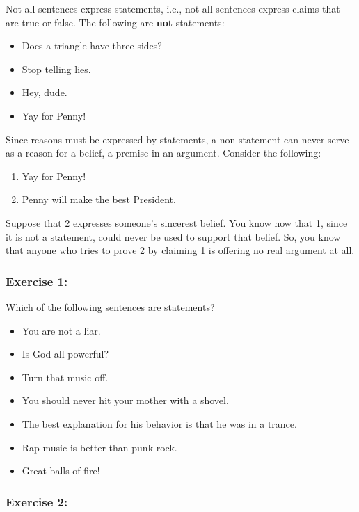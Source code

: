 \documentclass[]{article}
\providecommand{\tightlist}{%
  \setlength{\itemsep}{0pt}\setlength{\parskip}{0pt}}
\begin{document}
Not all sentences express statements, i.e., not all sentences express
claims that are true or false. The following are \textbf{not}
statements:

\begin{itemize}
\tightlist
\item
  Does a triangle have three sides?
\item
  Stop telling lies.
\item
  Hey, dude.
\item
  Yay for Penny!
\end{itemize}

Since reasons must be expressed by statements, a non-statement can never
serve as a reason for a belief, a premise in an argument. Consider the
following:

\begin{enumerate}
\def\labelenumi{\arabic{enumi}.}
\tightlist
\item
  Yay for Penny!
\item
  Penny will make the best President.
\end{enumerate}

Suppose that 2 expresses someone's sincerest belief. You know now that
1, since it is not a statement, could never be used to support that
belief. So, you know that anyone who tries to prove 2 by claiming 1 is
offering no real argument at all.

\subsubsection{Exercise 1:}\label{exercise-1}

Which of the following sentences are statements?

\begin{itemize}
\tightlist
\item
  You are not a liar.
\item
  Is God all-powerful?
\item
  Turn that music off.
\item
  You should never hit your mother with a shovel.
\item
  The best explanation for his behavior is that he was in a trance.
\item
  Rap music is better than punk rock.
\item
  Great balls of fire!
\end{itemize}

\subsubsection{Exercise 2:}\label{exercise-2}
\end{document}

